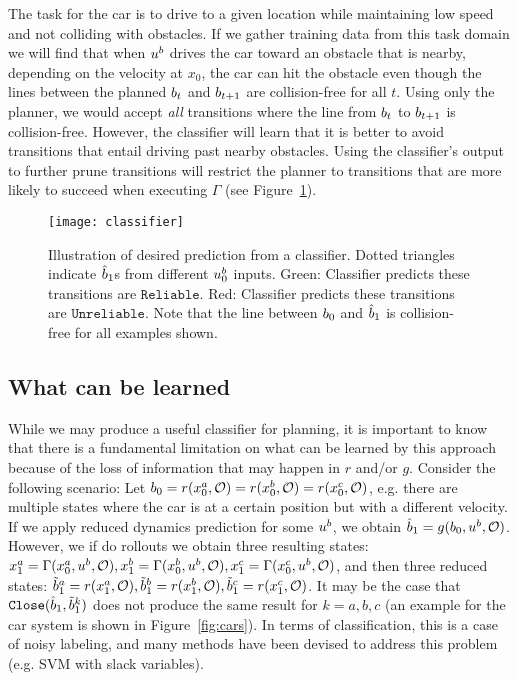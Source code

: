 The task for the car is to drive to a given location while maintaining low speed and not colliding with obstacles. If we gather training data from this task domain we will find that when $u^b$ drives the car toward an obstacle that is nearby, depending on the velocity at $x_0$, the car can hit the obstacle even though the lines between the planned $b_t$ and $b_{t+1}$ are collision-free for all $t$. Using only the planner, we would accept \textit{all} transitions where the line from $b_t$ to $b_{t+1}$ is collision-free. However, the classifier will learn that it is better to avoid transitions that entail driving past nearby obstacles. Using the classifier's output to further prune transitions will restrict the planner to transitions that are more likely to succeed when executing $\Gamma$ (see Figure~\ref{fig:classifier}).

\begin{figure}[h]
    \centering
    \texttt{[image: classifier]}
    \caption{Illustration of desired prediction from a classifier. Dotted triangles indicate $\hat{b}_1$s from different $u^b_0$ inputs. Green: Classifier predicts these transitions are $\texttt{Reliable}$. Red: Classifier predicts these transitions are $\texttt{Unreliable}$. Note that the line between $b_0$ and $\hat{b}_1$ is collision-free for all examples shown.}
    \label{fig:classifier}
\end{figure}

\subsection{What can be learned}

While we may produce a useful classifier for planning, it is important to know that there is a fundamental limitation on what can be learned by this approach because of the loss of information that may happen in $r$ and/or $g$. Consider the following scenario: Let $b_0 = r(x_0^a,\mathcal{O}) = r(x_0^b,\mathcal{O}) = r(x_0^c,\mathcal{O})$, e.g. there are multiple states where the car is at a certain position but with a different velocity. If we apply reduced dynamics prediction for some $u^b$, we obtain $\hat{b}_1 = g(b_0,u^b,\mathcal{O})$. However, we if do rollouts we obtain three resulting states: $x_1^a = \Gamma(x_0^a,u^b,\mathcal{O}), x_1^b = \Gamma(x_0^b,u^b,\mathcal{O}), x_1^c = \Gamma(x_0^c,u^b,\mathcal{O})$, and then three reduced states: $\tilde{b}_1^a = r(x_1^a,\mathcal{O}),\tilde{b}_1^b = r(x_1^b,\mathcal{O}), \tilde{b}_1^c = r(x_1^c,\mathcal{O})$. It may be the case that $\texttt{Close}(\hat{b}_1, \tilde{b}_1^k)$ does not produce the same result for $k={a,b,c}$ (an example for the car system is shown in Figure~\ref{fig:cars}). In terms of classification, this is a case of noisy labeling, and many methods have been devised to address this problem (e.g. SVM with slack variables). 

